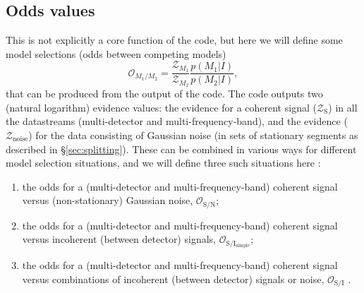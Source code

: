 \subsection{Odds values}\label{sec:odds}

This is not explicitly a core function of the code, but here we will define some model selections (odds between competing models)
\begin{equation}
 \mathcal{O}_{M_1/M_2} = \frac{\mathcal{Z}_{M_1}}{\mathcal{Z}_{M_2}}\frac{p(M_1|I)}{p(M_2|I)},
\end{equation}
that can be produced from the output of the code. The code outputs two (natural logarithm) evidence values: the evidence for a coherent signal
($\mathcal{Z}_{\text{S}}$)
in all the datastreams (multi-detector and multi-frequency-band), and the evidence ($\mathcal{Z}_{\text{noise}}$) for the data consisting of
Gaussian noise (in sets of stationary segments as described in \S\ref{sec:splitting}). These can be combined in various ways for different model
selection situations, and we will define three such situations here \citep[see, e.g.,][for two of these]{2017arXiv170107709T}:
\begin{enumerate}
 \item the odds for a (multi-detector and multi-frequency-band) coherent signal versus (non-stationary) Gaussian noise, $\mathcal{O}_{\text{S}/\text{N}}$;
 \item the odds for a (multi-detector and multi-frequency-band) coherent signal versus incoherent (between detector) signals, $\mathcal{O}_{\text{S}/\text{I}_{\text{simple}}}$;
 \item the odds for a (multi-detector and multi-frequency-band) coherent signal versus combinations of incoherent (between detector) signals or noise,
 $\mathcal{O}_{\text{S}/\text{I}}$ \citep[cf.\ Equation~A6 in][]{2017arXiv170107709T}.
\end{enumerate}

